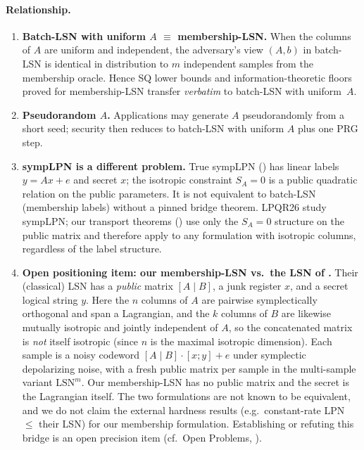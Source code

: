 \documentclass[11pt,a4paper]{article}
\theoremstyle{plain}
\theoremstyle{definition}
\begin{document}
\paragraph{Relationship.}
\begin{enumerate}
\item \textbf{Batch-LSN with uniform $A$ $\equiv$ membership-LSN.} When the columns of $A$ are uniform and independent, the adversary's view $(A,b)$ in batch-LSN is identical in distribution to $m$ independent samples from the membership oracle. Hence SQ lower bounds and information-theoretic floors proved for membership-LSN transfer \emph{verbatim} to batch-LSN with uniform~$A$.
\item \textbf{Pseudorandom $A$.} Applications may generate $A$ pseudorandomly from a short seed; security then reduces to batch-LSN with uniform $A$ plus one PRG step.
\item \textbf{sympLPN is a different problem.} True sympLPN () has linear labels $y = Ax + e$ and secret $x$; the isotropic constraint $S_A = 0$ is a public quadratic relation on the public parameters. It is not equivalent to batch-LSN (membership labels) without a pinned bridge theorem. LPQR26 study sympLPN; our transport theorems () use only the $S_A = 0$ structure on the public matrix and therefore apply to any formulation with isotropic columns, regardless of the label structure.
\item \textbf{Open positioning item: our membership-LSN vs.\ \linebreak[0] the LSN of \cite{KLP+25,LPQR26}.} Their (classical) LSN has a \emph{public} matrix $[A \mid B]$, a junk register $x$, and a secret logical string $y$. Here the $n$ columns of $A$ are pairwise symplectically orthogonal and span a Lagrangian, and the $k$ columns of $B$ are likewise mutually isotropic and jointly independent of $A$, so the concatenated matrix is \emph{not} itself isotropic (since $n$ is the maximal isotropic dimension). Each sample is a noisy codeword $[A \mid B] \cdot [x; y] + e$ under symplectic depolarizing noise, with a fresh public matrix per sample in the multi-sample variant $\mathrm{LSN}^m$. Our membership-LSN has no public matrix and the secret is the Lagrangian itself. The two formulations are not known to be equivalent, and we do not claim the external hardness results (e.g.\ constant-rate LPN $\le$ their LSN) for our membership formulation. Establishing or refuting this bridge is an open precision item (cf.\ Open Problems, ).
\end{enumerate}
\end{document}
